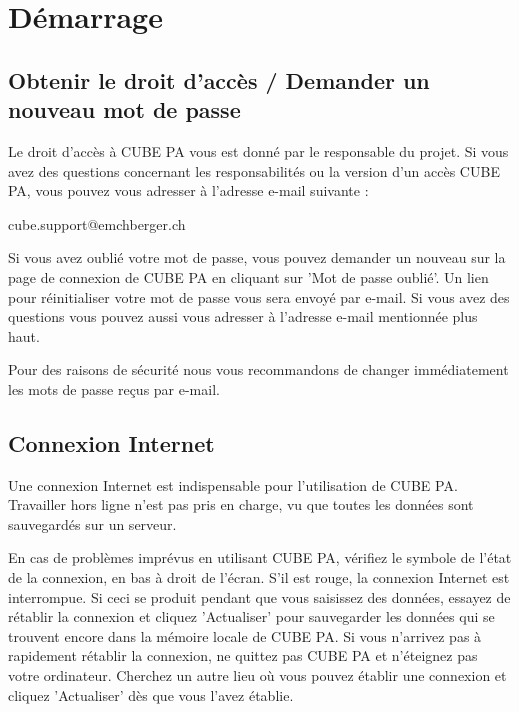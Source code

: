 

\section{Démarrage}
\subsection{Obtenir le droit d'accès / Demander un nouveau mot de passe}


Le droit d'accès à CUBE PA vous est donné par le responsable du projet. Si vous avez des questions concernant les responsabilités ou la version d'un accès CUBE PA, vous pouvez vous adresser à l'adresse e-mail suivante :

\vspace{\baselineskip}

{\color{red} cube.support@emchberger.ch}

\vspace{\baselineskip}

Si vous avez oublié votre mot de passe, vous pouvez demander un nouveau sur la page de connexion de CUBE PA en cliquant sur 'Mot de passe oublié'. Un lien pour réinitialiser votre mot de passe vous sera envoyé par e-mail. Si vous avez des questions vous pouvez aussi vous adresser à l'adresse e-mail mentionnée plus haut.

\vspace{\baselineskip}

Pour des raisons de sécurité nous vous recommandons de changer immédiatement les mots de passe reçus par e-mail.

\subsection{Connexion Internet}

Une connexion Internet est indispensable pour l'utilisation de CUBE PA. Travailler hors ligne n'est pas pris en charge, vu que toutes les données sont sauvegardés sur un serveur.

\vspace{\baselineskip}

En cas de problèmes imprévus en utilisant CUBE PA, vérifiez le symbole de l'état de la connexion, en bas à droit de l'écran. S'il est rouge, la connexion Internet est interrompue. Si ceci se produit pendant que vous saisissez des données, essayez de rétablir la connexion et cliquez 'Actualiser' pour sauvegarder les données qui se trouvent encore dans la mémoire locale de CUBE PA. Si vous n'arrivez pas à rapidement rétablir la connexion, ne quittez pas CUBE PA et n'éteignez pas votre ordinateur. Cherchez un autre lieu où vous pouvez établir une connexion et cliquez 'Actualiser' dès que vous l'avez établie.

